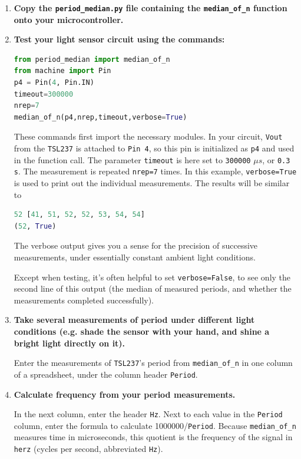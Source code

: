 \begin{enumerate}[resume]
	\item \textbf{Copy the \lstinline{period_median.py} file containing the \lstinline{median_of_n} function onto your microcontroller.}
	\item \textbf{Test your light sensor circuit using the commands:}
\begin{lstlisting}[language=Python]
from period_median import median_of_n
from machine import Pin
p4 = Pin(4, Pin.IN)
timeout=300000
nrep=7
median_of_n(p4,nrep,timeout,verbose=True)
\end{lstlisting}	
	These commands first import the necessary modules.
	In your circuit, \texttt{Vout} from the \texttt{TSL237} is attached to \texttt{Pin 4}, so this pin is initialized as \texttt{p4} and used in the function call.
	The parameter \texttt{timeout} is here set to \texttt{300000} $\mu s$, or \texttt{0.3 s}.
	The measurement is repeated \texttt{nrep=7} times.
	In this example, \texttt{verbose=True} is used to print out the individual measurements.
	The results will be similar to
\begin{lstlisting}[language=Python]
52 [41, 51, 52, 52, 53, 54, 54]
(52, True)
\end{lstlisting}		
	The verbose output gives you a sense for the precision of successive measurements, under essentially constant ambient light conditions.
	
	\smallskip
	Except when testing, it's often helpful to set \lstinline{verbose=False}, to see only the second line of this output (the median of measured periods, and whether the measurements completed successfully).
	 	
	\item \textbf{Take several measurements of period under different light conditions (e.g. shade the sensor with your hand, and shine a bright light directly on it).}
	
	Enter the measurements of \texttt{TSL237}'s period from \lstinline{median_of_n} in one column of a spreadsheet, under the column header \texttt{Period}.
	
	\item \textbf{Calculate frequency from your period measurements.}
	
	In the next column, enter the header \texttt{Hz}.
	Next to each value in the \texttt{Period} column, enter the formula to calculate 1000000/\texttt{Period}.
	Because \lstinline{median_of_n} measures time in microseconds, this quotient is the frequency of the signal in \texttt{herz} (cycles per second, abbreviated \texttt{Hz}).
	

\end{enumerate}
